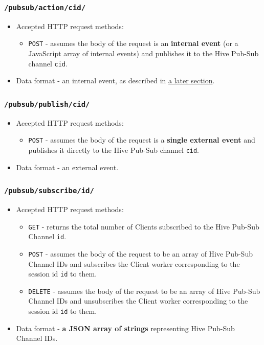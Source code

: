 \documentclass[a4paper]{article}
\begin{document}
\subsubsection{\texttt{/pubsub/action/cid/}}
\label{sec-6-1-6}
\label{ref-api_pubsub}



\begin{itemize}
\item Accepted HTTP request methods:
\begin{itemize}
\item \texttt{POST} - assumes the body of the request is an \textbf{internal event} (or a JavaScript array of internal events) and publishes it to the Hive Pub-Sub channel \texttt{cid}.
\end{itemize}
\item Data format - an internal event, as described in \hyperref[sec-9-3]{a later section}.
\end{itemize}
\subsubsection{\texttt{/pubsub/publish/cid/}}
\label{sec-6-1-7}



\begin{itemize}
\item Accepted HTTP request methods:
\begin{itemize}
\item \texttt{POST} - assumes the body of the request is a \textbf{single external event} and publishes it directly to the Hive Pub-Sub channel \texttt{cid}.
\end{itemize}
\item Data format - an external event.
\end{itemize}
\subsubsection{\texttt{/pubsub/subscribe/id/}}
\label{sec-6-1-8}



\begin{itemize}
\item Accepted HTTP request methods:
\begin{itemize}
\item \texttt{GET} - returns the total number of Clients subscribed to the Hive Pub-Sub Channel \texttt{id}.
\item \texttt{POST} - assumes the body of the request to be an array of Hive Pub-Sub Channel IDs and subscribes the Client worker corresponding to the session id \texttt{id} to them.
\item \texttt{DELETE} - assumes the body of the request to be an array of Hive Pub-Sub Channel IDs and unsubscribes the Client worker corresponding to the session id \texttt{id} to them.
\end{itemize}
\item Data format - \textbf{a JSON array of strings} representing Hive Pub-Sub Channel IDs.
\end{itemize}
\end{document}
